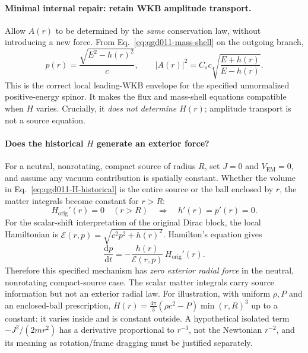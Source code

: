 \documentclass[11pt,a4paper]{article}
\newcommand{\dd}{\mathrm d}
\begin{document}
\paragraph{Minimal internal repair: retain WKB amplitude transport.}
Allow $A(r)$ to be determined by the \emph{same} conservation law, without introducing a new force.  From Eq.~\eqref{eq:qgd011-mass-shell} on the outgoing branch,
\begin{equation}\label{eq:qgd011-envelope}
 p(r)=\frac{\sqrt{E^2-h(r)^2}}{c},\qquad
 \boxed{|A(r)|^2=C_s c\sqrt{\frac{E+h(r)}{E-h(r)}}.}
\end{equation}
This is the correct local leading-WKB envelope for the specified unnormalized positive-energy spinor. It makes the flux and mass-shell equations compatible when $H$ varies.  Crucially, it \emph{does not determine $H(r)$}; amplitude transport is not a source equation.

\paragraph{Does the historical $H$ generate an exterior force?}
For a neutral, nonrotating, compact source of radius $R$, set $J=0$ and $V_{\mathrm{EM}}=0$, and assume any vacuum contribution is spatially constant.  Whether the volume in Eq.~\eqref{eq:qgd011-H-historical} is the entire source or the ball enclosed by $r$, the matter integrals become constant for $r>R$:
\begin{equation}\label{eq:qgd011-outside}
 \boxed{H_{\mathrm{orig}}'(r)=0\quad(r>R)}
 \quad\Longrightarrow\quad
 h'(r)=p'(r)=0.
\end{equation}
For the scalar-shift interpretation of the original Dirac block, the local Hamiltonian is $\mathcal E(r,p)=\sqrt{c^2p^2+h(r)^2}$. Hamilton's equation gives
\begin{equation}\label{eq:qgd011-force}
 \boxed{\frac{\dd p}{\dd t}=-\frac{h(r)}{\mathcal E(r,p)}\,H_{\mathrm{orig}}'(r).}
\end{equation}
Therefore this specified mechanism has \emph{zero exterior radial force} in the neutral, nonrotating compact-source case.  The scalar matter integrals carry source information but not an exterior radial law. For illustration, with uniform $\rho,P$ and an enclosed-ball prescription, $H(r)=\tfrac{4\pi}{3}(\rho c^2-P)\min(r,R)^3$ up to a constant: it varies inside and is constant outside. A hypothetical isolated term $-J^2/(2mr^2)$ has a derivative proportional to $r^{-3}$, not the Newtonian $r^{-2}$, and its meaning as rotation/frame dragging must be justified separately.
\end{document}
